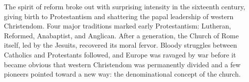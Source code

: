 
\begin{partsummary}
The spirit of reform broke out with surprising intensity in the sixteenth century, giving birth to
Protestantism and shattering the papal leadership of western Christendom. Four major traditions
marked early Protestantism: Lutheran, Reformed, Anabaptist, and Anglican. After a generation, the
Church of Rome itself, led by the Jesuits, recovered its moral fervor. Bloody struggles between
Catholics and Protestants followed, and Europe was ravaged by war before it became obvious that
western Christendom was permanently divided and a few pioneers pointed toward a new way: the
denominational concept of the church.
\end{partsummary}

